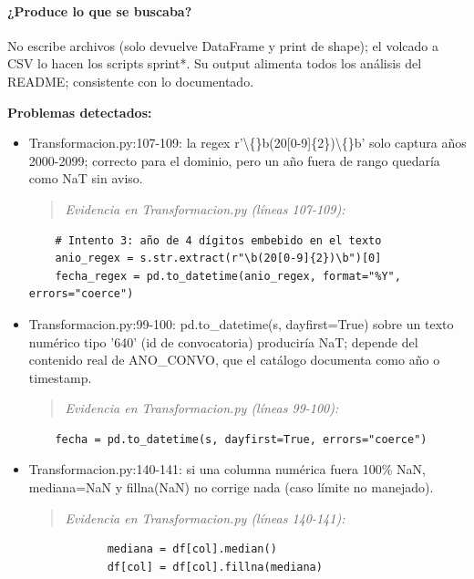 \paragraph{¿Produce lo que se buscaba?}
No escribe archivos (solo devuelve DataFrame y print de shape); el volcado a CSV lo hacen los scripts sprint*. Su output alimenta todos los análisis del README; consistente con lo documentado.

\begin{tcolorbox}[riesgo]
\textbf{Problemas detectados:}
\begin{itemize}
  \item Transformacion.py:107-109: la regex r'\textbackslash\{\}b(20[0-9]\{2\})\textbackslash\{\}b' solo captura años 2000-2099; correcto para el dominio, pero un año fuera de rango quedaría como NaT sin aviso.
\begin{quote}\footnotesize\ttfamily
\noindent\emph{Evidencia en Transformacion.py (líneas 107-109):}
\end{quote}
\begin{lstlisting}
    # Intento 3: año de 4 dígitos embebido en el texto
    anio_regex = s.str.extract(r"\b(20[0-9]{2})\b")[0]
    fecha_regex = pd.to_datetime(anio_regex, format="%Y", errors="coerce")
\end{lstlisting}

  \item Transformacion.py:99-100: pd.to\_datetime(s, dayfirst=True) sobre un texto numérico tipo '640' (id de convocatoria) produciría NaT; depende del contenido real de ANO\_CONVO, que el catálogo documenta como año o timestamp.
\begin{quote}\footnotesize\ttfamily
\noindent\emph{Evidencia en Transformacion.py (líneas 99-100):}
\end{quote}
\begin{lstlisting}
    fecha = pd.to_datetime(s, dayfirst=True, errors="coerce")

\end{lstlisting}

  \item Transformacion.py:140-141: si una columna numérica fuera 100\% NaN, mediana=NaN y fillna(NaN) no corrige nada (caso límite no manejado).
\begin{quote}\footnotesize\ttfamily
\noindent\emph{Evidencia en Transformacion.py (líneas 140-141):}
\end{quote}
\begin{lstlisting}
            mediana = df[col].median()
            df[col] = df[col].fillna(mediana)
\end{lstlisting}

\end{itemize}
\end{tcolorbox}

